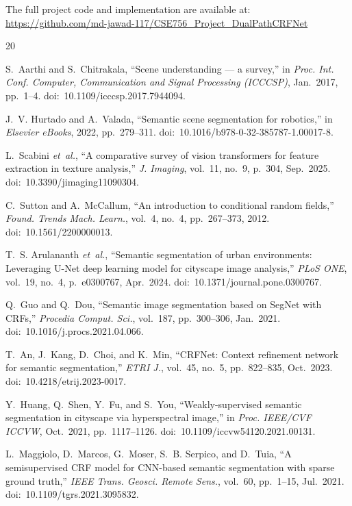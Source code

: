 \documentclass[conference]{IEEEtran}
\begin{document}
The full project code and implementation are available at:
\url{https://github.com/md-jawad-117/CSE756_Project_DualPathCRFNet}

 


\begin{thebibliography}{20}

S.~Aarthi and S.~Chitrakala,
``Scene understanding --- a survey,''
in \emph{Proc. Int. Conf. Computer, Communication and Signal Processing (ICCCSP)},
Jan.~2017, pp.~1--4.
doi:~10.1109/icccsp.2017.7944094.

J.~V. Hurtado and A.~Valada,
``Semantic scene segmentation for robotics,''
in \emph{Elsevier eBooks}, 2022, pp.~279--311.
doi:~10.1016/b978-0-32-385787-1.00017-8.

L.~Scabini \emph{et~al.},
``A comparative survey of vision transformers for feature extraction in texture analysis,''
\emph{J. Imaging}, vol.~11, no.~9, p.~304, Sep.~2025.
doi:~10.3390/jimaging11090304.

C.~Sutton and A.~McCallum,
``An introduction to conditional random fields,''
\emph{Found. Trends Mach. Learn.}, vol.~4, no.~4, pp.~267--373, 2012.
doi:~10.1561/2200000013.

T.~S. Arulananth \emph{et~al.},
``Semantic segmentation of urban environments: Leveraging U-Net deep learning model
for cityscape image analysis,''
\emph{PLoS ONE}, vol.~19, no.~4, p.~e0300767, Apr.~2024.
doi:~10.1371/journal.pone.0300767.

Q.~Guo and Q.~Dou,
``Semantic image segmentation based on SegNet with CRFs,''
\emph{Procedia Comput. Sci.}, vol.~187, pp.~300--306, Jan.~2021.
doi:~10.1016/j.procs.2021.04.066.

T.~An, J.~Kang, D.~Choi, and K.~Min,
``CRFNet: Context refinement network for semantic segmentation,''
\emph{ETRI J.}, vol.~45, no.~5, pp.~822--835, Oct.~2023.
doi:~10.4218/etrij.2023-0017.

Y.~Huang, Q.~Shen, Y.~Fu, and S.~You,
``Weakly-supervised semantic segmentation in cityscape via hyperspectral image,''
in \emph{Proc. IEEE/CVF ICCVW}, Oct.~2021, pp.~1117--1126.
doi:~10.1109/iccvw54120.2021.00131.

L.~Maggiolo, D.~Marcos, G.~Moser, S.~B. Serpico, and D.~Tuia,
``A semisupervised CRF model for CNN-based semantic segmentation with sparse ground truth,''
\emph{IEEE Trans. Geosci. Remote Sens.}, vol.~60, pp.~1--15, Jul.~2021.
doi:~10.1109/tgrs.2021.3095832.


\end{thebibliography}
\end{document}
